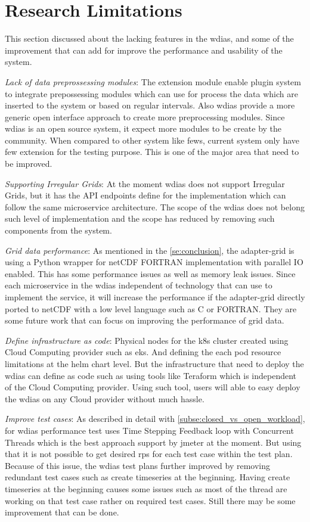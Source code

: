 \section{Research Limitations}
This section discussed about the lacking features in the \acrshort{wdias}, and some of the improvement that can add for improve the performance and usability of the system.

\emph{Lack of data preprossessing modules}:
The extension module enable plugin system to integrate prepossessing modules which can use for process the data which are inserted to the system or based on regular intervals. Also \acrshort{wdias} provide a more generic open interface approach to create more preprocessing modules. Since \acrshort{wdias} is an open source system, it expect more modules to be create by the community. When compared to other system like \acrshort{fews}, current system only have few extension for the testing purpose. This is one of the major area that need to be improved.

\emph{Supporting Irregular Grids}:
At the moment \acrshort{wdias} does not support Irregular Grids, but it has the API endpoints define for the implementation which can follow the same microservice architecture. The scope of the \acrshort{wdias} does not belong such level of implementation and the scope has reduced by removing such components from the system.

\emph{Grid data performance}:
As mentioned in the \ref{se:conclusion}, the adapter-grid is using a Python wrapper for netCDF FORTRAN implementation with parallel IO enabled. This has some performance issues as well as memory leak issues. Since each microservice in the \acrshort{wdias} independent of technology that can use to implement the service, it will increase the performance if the adapter-grid directly ported to netCDF with a low level language such as C or FORTRAN. They are some future work that can focus on improving the performance of grid data.

\emph{Define infrastructure as code}:
Physical nodes for the \acrshort{k8s} cluster created using Cloud Computing provider such as \acrshort{eks}. And defining the each pod resource limitations at the helm chart level. But the infrastructure that need to deploy the \acrshort{wdias} can define as code such as using tools like Teraform which is independent of the Cloud Computing provider. Using such tool, users will able to easy deploy the \acrshort{wdias} on any Cloud provider without much hassle.

\emph{Improve test cases}:
As described in detail with \ref{subse:closed_vs_open_workload}, for \acrshort{wdias} performance test uses Time Stepping Feedback loop with Concurrent Threads which is the best approach support by \acrshort{jmeter} at the moment. But using that it is not possible to get desired \acrshort{rps} for each test case within the test plan.
Because of this issue, the \acrshort{wdias} test plans further improved by removing redundant test cases such as create timeseries at the beginning. Having create timeseries at the beginning causes some issues such as most of the thread are working on that test case rather on required test cases. Still there may be some improvement that can be done. 

